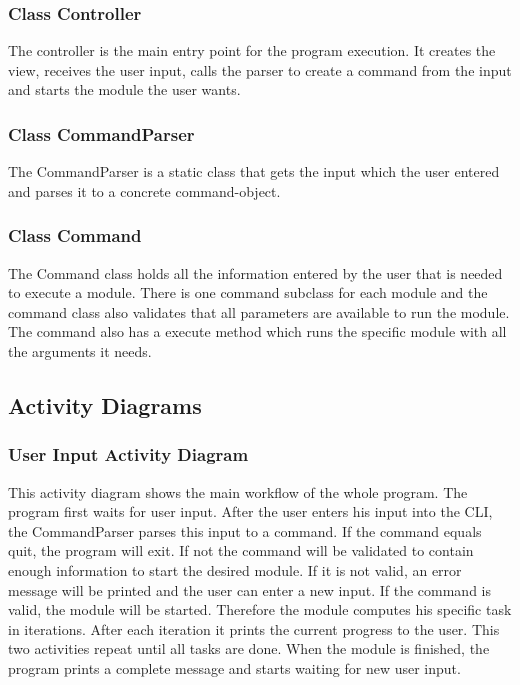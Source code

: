 \documentclass[parskip=full]{scrartcl}
\begin{document}
\subsubsection{Class Controller} 
The controller is the main entry point for the program execution. 
It creates the view, receives the user input, calls the parser to create a command from the input and starts the module the user wants.

\subsubsection{Class CommandParser}
The CommandParser is a static class that gets the input which the user entered and parses it to a concrete command-object.

\subsubsection{Class Command}
The Command class holds all the information entered by the user that is needed to execute a module.
There is one command subclass for each module and the command class also validates that all parameters are available to run the module.
The command also has a execute method which runs the specific module with all the arguments it needs.

\newpage

\subsection{Activity Diagrams}

\subsubsection{User Input Activity Diagram}

\begin{figure}[h]
\begin{center}

\label{User Input Activity Diagram}
\end{center}
\end{figure}
\newpage

This activity diagram shows the main workflow of the whole program.
The program first waits for user input.
After the user enters his input into the \gls{CLI}, the CommandParser parses this input to a command.
If the command equals quit, the program will exit.
If not the command will be validated to contain enough information to start the desired module.
If it is not valid, an error message will be printed and the user can enter a new input.
If the command is valid, the module will be started.
Therefore the module computes his specific task in iterations.
After each iteration it prints the current progress to the user.
This two activities repeat until all tasks are done.
When the module is finished, the program prints a complete message and starts waiting for new user input.
\end{document}

